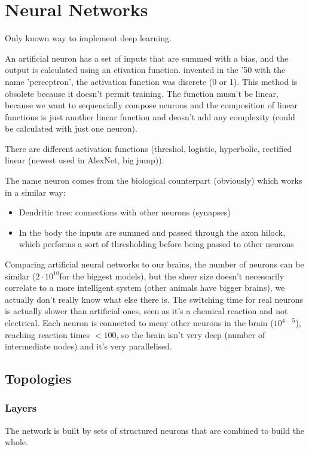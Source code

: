 
\chapter{Neural Networks}
Only known way to implement deep learning. 

An artificial neuron has a set of inputs that are summed with a bias, and the output is calculated using an ctivation function. invented in the '50 with the name 'perceptron', the activation function was discrete (0 or 1). This method is obsolete because it doesn't permit training. The function musn't be linear, because we want to sequencially compose neurons and the composition of linear functions is just another linear function and deosn't add any complexity (could be calculated with just one neuron). 

There are different activation functions (threshol, logistic, hyperbolic, rectified linear (newest used in AlexNet, big jump)). 

The name neuron comes from the biological counterpart (obviously) which works in a similar way:
\begin{itemize}
  \item Dendritic tree: connections with other neurons (synapses)
    \item In the body the inputs are summed and passed through the axon hilock, which performs a sort of thresholding before being passed to other neurons
\end{itemize}

Comparing artificial neural networks to our brains, the number of neurons can be similar ($ 2\cdot 10^{10} $for the biggest models), but the sheer size doesn't necessarily correlate to a more intelligent system (other animals have bigger brains), we actually don't really know what else there is. The switching time for real neurons is actually slower than artificial ones, seen as it's a chemical reaction and not electrical. Each neuron is connected to meny other neurons in the brain ($ 10^{4-5} $), reaching reaction times $ < 100 $, so the brain isn't very deep (number of intermediate nodes) and it's very parallelised.

\section{Topologies}

\subsection{Layers}
The network is built by sets of structured neurons that are combined to build the whole.

